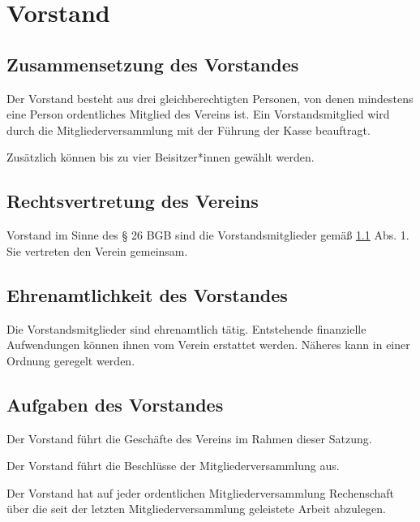 \chapter{Vorstand}

\section{Zusammensetzung des Vorstandes}\label{cha:vorstand}
\begin{absätze}
    \item Der Vorstand besteht aus drei gleichberechtigten Personen, von denen mindestens eine Person ordentliches Mitglied des Vereins ist. Ein Vorstandsmitglied wird durch die Mitgliederversammlung mit der Führung der Kasse beauftragt.
    \item Zusätzlich können bis zu vier Beisitzer*innen gewählt werden.
\end{absätze}

\section{Rechtsvertretung des Vereins}
Vorstand im Sinne des § 26 BGB sind die Vorstandsmitglieder gemäß \ref{cha:vorstand} Abs. 1. Sie vertreten den Verein gemeinsam.

\section{Ehrenamtlichkeit des Vorstandes}
Die Vorstandsmitglieder sind ehrenamtlich tätig. Entstehende finanzielle Aufwendungen können ihnen vom Verein erstattet werden. Näheres kann in einer Ordnung geregelt werden.
    
\section{Aufgaben des Vorstandes}
\begin{absätze}
    \item Der Vorstand führt die Geschäfte des Vereins im Rahmen dieser Satzung.
    \item Der Vorstand führt die Beschlüsse der Mitgliederversammlung aus.
    \item Der Vorstand hat auf jeder ordentlichen Mitgliederversammlung Rechenschaft über die seit der letzten Mitgliederversammlung geleistete Arbeit abzulegen.
\end{absätze}

